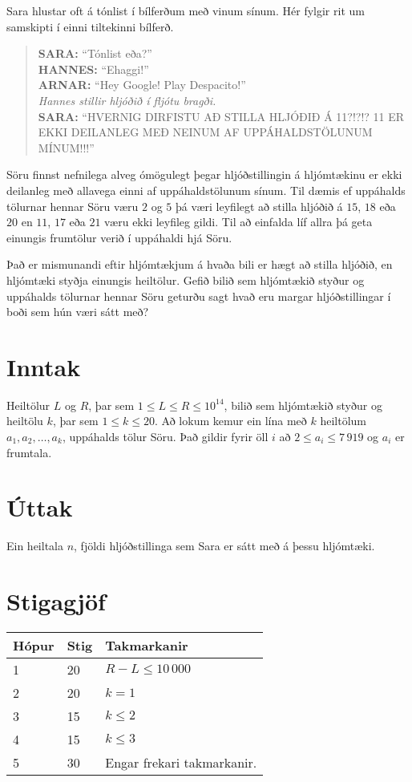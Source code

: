 \noindent
Sara hlustar oft á tónlist í bílferðum með vinum sínum. Hér fylgir rit um samskipti í einni tiltekinni bílferð.

\begin{quote}
    \textbf{SARA:} ``Tónlist eða?''\\
    \textbf{HANNES:} ``Ehaggi!''\\
    \textbf{ARNAR:} ``Hey Google! Play Despacito!''\\
    \textit{Hannes stillir hljóðið í fljótu bragði.}\\
    \textbf{SARA:} ``HVERNIG DIRFISTU AÐ STILLA HLJÓÐIÐ Á 11?!?!? 11 ER EKKI DEILANLEG MEÐ NEINUM AF UPPÁHALDSTÖLUNUM MÍNUM!!!''\\
\end{quote}

Söru finnst nefnilega alveg ómögulegt þegar hljóðstillingin á hljómtækinu er ekki deilanleg með allavega einni af uppáhaldstölunum sínum.
Til dæmis ef uppáhalds tölurnar hennar Söru væru $2$ og $5$ þá væri leyfilegt að stilla hljóðið á $15$, $18$ eða $20$ en $11$, $17$ eða $21$ væru ekki leyfileg gildi.
Til að einfalda líf allra þá geta einungis frumtölur verið í uppáhaldi hjá Söru.

Það er mismunandi eftir hljómtækjum á hvaða bili er hægt að stilla hljóðið, en hljómtæki styðja einungis heiltölur. Gefið bilið sem hljómtækið styður og uppáhalds tölurnar hennar Söru geturðu sagt hvað eru margar hljóðstillingar í boði sem hún væri sátt með?

\section*{Inntak}
Heiltölur $L$ og $R$, þar sem $1 \leq L \leq R \leq 10^{14}$, bilið sem hljómtækið styður og heiltölu $k$, þar sem $1 \leq k \leq 20$. 
Að lokum kemur ein lína með $k$ heiltölum $a_1, a_2, \dotsc, a_k$, uppáhalds tölur Söru.
Það gildir fyrir öll $i$ að $2 \leq a_i \leq 7\,919$ og $a_i$ er frumtala.

\section*{Úttak}
Ein heiltala $n$, fjöldi hljóðstillinga sem Sara er sátt með á þessu hljómtæki.

\section*{Stigagjöf}
\begin{tabular}{|l|l|l|}
\hline
Hópur & Stig & Takmarkanir \\ \hline
\hline
1     & 20   & $R-L \leq 10\,000$ \\
\hline
2     & 20   & $k = 1$ \\
\hline
3     & 15   & $k \leq 2$ \\
\hline
4     & 15   & $k \leq 3$ \\
\hline
5     & 30   & Engar frekari takmarkanir. \\
\hline
\end{tabular}
